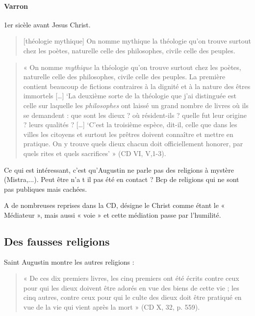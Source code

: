 \paragraph{Varron} 1er sicèle avant Jesus Christ. 


\begin{quote}[théologie mythique]
 On nomme mythique la théologie qu’on trouve surtout chez les poètes, naturelle celle des philosophes, civile celle des peuples.   
\end{quote}

\begin{quote}
    « On nomme \textit{mythique} la théologie qu’on trouve surtout chez les poètes, naturelle celle des philosophes, civile celle des peuples. La première contient beaucoup de fictions contraires à la dignité et à la nature des êtres immortels […] ‘La deuxième sorte de la théologie que j’ai distinguée est celle sur laquelle les \textit{philosophes} ont laissé un grand nombre de livres où ils se demandent : que sont les dieux ? où résident-ils ? quelle fut leur origine ? leurs qualités ? […] ‘C’est la troisième espèce, dit-il, celle que dans les villes les citoyens et surtout les prêtres doivent connaître et mettre en pratique. On y trouve quels dieux chacun doit officiellement honorer, par quels rites et quels sacrifices’ » (CD VI, V,1-3). 
\end{quote}

Ce qui est intéressant, c'est qu'Augustin ne parle pas des religions à mystère (Mistra,...). Peut être n'a t il pas été en contact ? Bcp de religions qui ne sont pas publiques mais cachées.







A de nombreuses reprises dans la CD, désigne le Christ comme étant le « Médiateur », mais aussi « voie » et cette médiation passe par l’humilité. 



\subsection{Des fausses religions }
 
Saint Augustin montre les autres religions :  
 

\begin{quote}
    « De ces dix premiers livres, les cinq premiers ont été écrits contre ceux pour qui les dieux doivent être adorés en vue des biens de cette vie ; les cinq autres, contre ceux pour qui le culte des dieux doit être pratiqué en vue de la vie qui vient après la mort » (CD X, 32,  p. 559). 
\end{quote}

